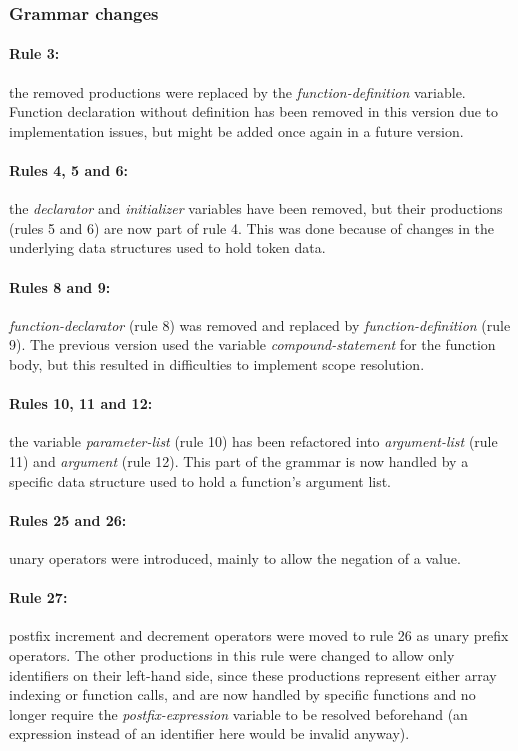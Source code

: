 \normalsize

\subsubsection{Grammar changes}
\paragraph{Rule 3:} the removed productions were replaced by the \textit{function-definition} variable.
Function declaration without definition has been removed in this version due to implementation issues,
but might be added once again in a future version.

\paragraph{Rules 4, 5 and 6:} the \textit{declarator} and \textit{initializer} variables have been
removed, but their productions (rules 5 and 6) are now part of rule 4. This was done because
of changes in the underlying data structures used to hold token data.

\paragraph{Rules 8 and 9:} \textit{function-declarator} (rule 8) was removed and replaced by
\textit{function-definition} (rule 9). The previous version used the variable
\textit{compound-statement} for the function body, but this resulted in difficulties
to implement scope resolution.

\paragraph{Rules 10, 11 and 12:} the variable \textit{parameter-list} (rule 10) has been
refactored into \textit{argument-list} (rule 11) and \textit{argument} (rule 12). This part of
the grammar is now handled by a specific data structure used to hold a function's argument list.

\paragraph{Rules 25 and 26:} unary operators were introduced, mainly to allow the negation
of a value.

\paragraph{Rule 27:} postfix increment and decrement operators were moved to rule 26 as unary prefix
operators. The other productions in this rule were changed to allow only identifiers on their left-hand
side, since these productions represent either array indexing or function calls, and are now handled
by specific functions and no longer require the \textit{postfix-expression} variable to be resolved
beforehand (an expression instead of an identifier here would be invalid anyway).

